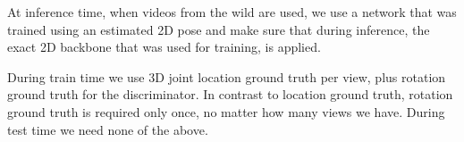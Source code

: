 At inference time, when videos from the wild are used, we use a network that was trained using an estimated 2D pose and make sure that during inference, the exact 2D backbone that was used for training, is applied.

During train time we use 3D joint location ground truth per view, plus rotation ground truth for the discriminator. 
In contrast to location ground truth, rotation ground truth is required only once, no matter how many views we have.
During test time we need none of the above.


% 




